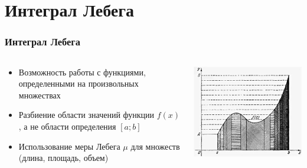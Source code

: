 \documentclass[aspectratio=169]{beamer}
\begin{document}
\section{Интеграл Лебега}

\begin{frame}
\frametitle{Интеграл Лебега}
\begin{columns}[c]
    \begin{column}{0.55\textwidth}
        \begin{itemize}
            \item Возможность работы с функциями, определенными на произвольных множествах
            \item Разбиение области значений функции $f(x)$, а не области определения $[a; b]$
            \item Использование меры Лебега $\mu$ для множеств (длина, площадь, объем)
        \end{itemize}
    \end{column}
    \begin{column}{0.35\textwidth}
        \includegraphics[width=\textwidth]{images/lebesgue_integral.jpg}
    \end{column}
\end{columns}
\end{frame}
\end{document}
